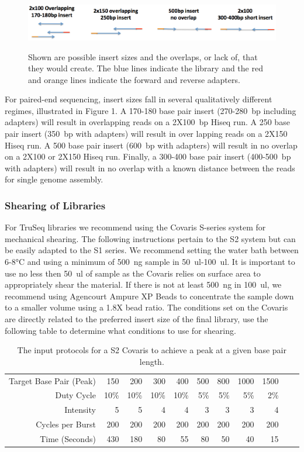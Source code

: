 \documentclass[graybox]{svmult}
\begin{document}
\begin{figure}[t]
\caption{Shown are possible insert sizes and the overlaps, or lack of, that they would create. The blue lines indicate the library and the red and orange lines indicate the forward and reverse adapters.}
\includegraphics[scale=.35]{imgs/image1.eps}
%
\label{fig:1}       %
\end{figure}

For paired-end sequencing, insert sizes fall in several qualitatively different regimes, illustrated in Figure 1.    A 170-180 base pair insert (270-280~bp including adapters) will result in overlapping reads on a 2X100~bp Hiseq run. A 250 base pair insert  (350~bp with adapters) will result in over lapping reads on a 2X150 Hiseq run. A 500 base pair insert (600~bp with adapters) will result in no overlap on a 2X100 or 2X150 Hiseq run. Finally, a 300-400 base pair insert (400-500~bp with adapters) will result in no overlap with a known distance between the reads for single genome assembly.

\subsubsection{Shearing of Libraries}

For TruSeq libraries we recommend using the Covaris S-series system for mechanical shearing. The following instructions pertain to the S2 system but can be easily adapted to the S1 series.  We recommend setting the water bath between 6-8°C and using a minimum of 500~ng sample in 50~ul-100~ul. It is important to use no less then 50~ul of sample as the Covaris relies on surface area to appropriately shear the material.  If there is not at least 500~ng in 100~ul, we recommend using Agencourt Ampure XP Beads to concentrate the sample down to a smaller volume using a 1.8X bead ratio.  The conditions set on the Covaris are directly related to the preferred insert size of the final library, use the following table to determine what conditions to use for shearing.

\begin{table}
\label{shearingtable}
\caption{The input protocols for a S2 Covaris to achieve a peak at a given base pair length.}
\begin{tabular}{rrrrrrrrrrr}
Target Base Pair (Peak) & 150 & 200 & 300 & 400 & 500 & 800 & 1000 & 1500  \\
Duty Cycle & 10\% & 10\% & 10\% & 10\% & 5\% & 5\% & 5\% & 2\%  \\
Intensity & 5 & 5 & 4 & 4 & 3 & 3 & 3 & 4  \\
Cycles per Burst & 200 & 200 & 200 & 200 & 200 & 200 & 200 & 200  \\
Time (Seconds) & 430 & 180 & 80 & 55 & 80 & 50 & 40 & 15  \\
\end{tabular}
\end{table}
\end{document}

